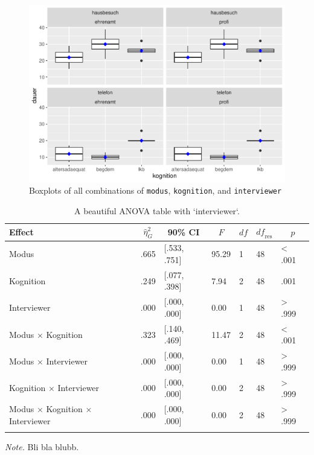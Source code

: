 \documentclass[
  doc,floatsintext]{apa6}
\begin{document}
\begin{figure}
\centering
\includegraphics{desc_aov_files/figure-latex/df3boxplot-1.pdf}
\caption{\label{fig:df3boxplot}Boxplots of all combinations of \texttt{modus}, \texttt{kognition}, and \texttt{interviewer}}
\end{figure}

\begin{table}[tbp]

\begin{center}
\begin{threeparttable}

\caption{\label{tab:tabanova3}A beautiful ANOVA table with `interviewer`.}

\begin{tabular}{lllllll}
\toprule
Effect & \multicolumn{1}{c}{$\hat{\eta}^2_G$} & \multicolumn{1}{c}{90\% CI} & \multicolumn{1}{c}{$F$} & \multicolumn{1}{c}{$\mathit{df}$} & \multicolumn{1}{c}{$\mathit{df}_{\mathrm{res}}$} & \multicolumn{1}{c}{$p$}\\
\midrule
Modus & .665 & {}[.533, .751] & 95.29 & 1 & 48 & < .001\\
Kognition & .249 & {}[.077, .398] & 7.94 & 2 & 48 & .001\\
Interviewer & .000 & {}[.000, .000] & 0.00 & 1 & 48 & > .999\\
Modus $\times$ Kognition & .323 & {}[.140, .469] & 11.47 & 2 & 48 & < .001\\
Modus $\times$ Interviewer & .000 & {}[.000, .000] & 0.00 & 1 & 48 & > .999\\
Kognition $\times$ Interviewer & .000 & {}[.000, .000] & 0.00 & 2 & 48 & > .999\\
Modus $\times$ Kognition $\times$ Interviewer & .000 & {}[.000, .000] & 0.00 & 2 & 48 & > .999\\
\bottomrule
\addlinespace
\end{tabular}

\begin{tablenotes}[para]
\normalsize{\textit{Note.} Bli bla blubb.}
\end{tablenotes}

\end{threeparttable}
\end{center}

\end{table}
\end{document}
